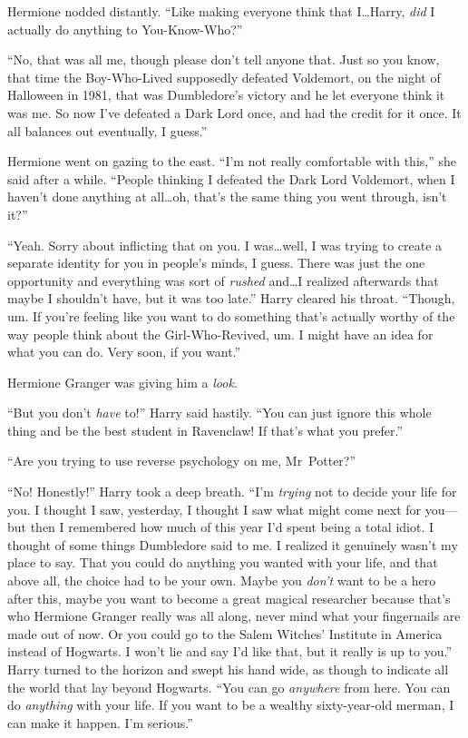 Hermione nodded distantly. “Like making everyone think that I…Harry, \emph{did} I actually do anything to You-Know-Who?”

“No, that was all me, though please don’t tell anyone that. Just so you know, that time the Boy-Who-Lived supposedly defeated Voldemort, on the night of Halloween in 1981, that was Dumbledore’s victory and he let everyone think it was me. So now I’ve defeated a Dark Lord once, and had the credit for it once. It all balances out eventually, I guess.”

Hermione went on gazing to the east. “I’m not really comfortable with this,” she said after a while. “People thinking I defeated the Dark Lord Voldemort, when I haven’t done anything at all…oh, that’s the same thing you went through, isn’t it?”

“Yeah. Sorry about inflicting that on you. I was…well, I was trying to create a separate identity for you in people’s minds, I guess. There was just the one opportunity and everything was sort of \emph{rushed} and…I realized afterwards that maybe I shouldn’t have, but it was too late.” Harry cleared his throat. “Though, um. If you’re feeling like you want to do something that’s actually worthy of the way people think about the Girl-Who-Revived, um. I might have an idea for what you can do. Very soon, if you want.”

Hermione Granger was giving him a \emph{look.}

“But you don’t \emph{have} to!” Harry said hastily. “You can just ignore this whole thing and be the best student in Ravenclaw! If that’s what you prefer.”

“Are you trying to use reverse psychology on me, Mr~Potter?”

“No! Honestly!” Harry took a deep breath. “I’m \emph{trying} not to decide your life for you. I thought I saw, yesterday, I thought I saw what might come next for you—but then I remembered how much of this year I’d spent being a total idiot. I thought of some things Dumbledore said to me. I realized it genuinely wasn’t my place to say. That you could do anything you wanted with your life, and that above all, the choice had to be your own. Maybe you \emph{don’t} want to be a hero after this, maybe you want to become a great magical researcher because that’s who Hermione Granger really was all along, never mind what your fingernails are made out of now. Or you could go to the Salem Witches’ Institute in America instead of Hogwarts. I won’t lie and say I’d like that, but it really is up to you.” Harry turned to the horizon and swept his hand wide, as though to indicate all the world that lay beyond Hogwarts. “You can go \emph{anywhere} from here. You can do \emph{anything} with your life. If you want to be a wealthy sixty-year-old merman, I can make it happen. I’m serious.”

